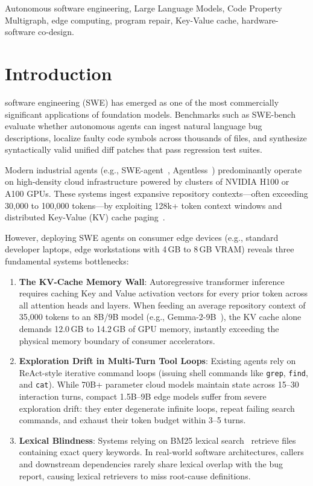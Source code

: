 \documentclass[journal]{IEEEtran}
\begin{document}
\begin{IEEEkeywords}
Autonomous software engineering, Large Language Models, Code Property Multigraph, edge computing, program repair, Key-Value cache, hardware-software co-design.
\end{IEEEkeywords}


\section{Introduction}
\label{sec:intro}

 software engineering (SWE) has emerged as one of the most commercially significant applications of foundation models. Benchmarks such as SWE-bench~\cite{jimenez2024swebench} evaluate whether autonomous agents can ingest natural language bug descriptions, localize faulty code symbols across thousands of files, and synthesize syntactically valid unified diff patches that pass regression test suites.

Modern industrial agents (e.g., SWE-agent~\cite{yang2024sweagent}, Agentless~\cite{xia2024agentless}) predominantly operate on high-density cloud infrastructure powered by clusters of NVIDIA H100 or A100 GPUs. These systems ingest expansive repository contexts---often exceeding 30,000 to 100,000 tokens---by exploiting 128k+ token context windows and distributed Key-Value (KV) cache paging~\cite{kwon2023vllm}.

However, deploying SWE agents on consumer edge devices (e.g., standard developer laptops, edge workstations with 4\,GB to 8\,GB VRAM) reveals three fundamental systems bottlenecks:
\begin{enumerate}
    \item \textbf{The KV-Cache Memory Wall}: Autoregressive transformer inference requires caching Key and Value activation vectors for every prior token across all attention heads and layers. When feeding an average repository context of 35,000 tokens to an 8B/9B model (e.g., Gemma-2-9B~\cite{gemmateam2024gemma2}), the KV cache alone demands 12.0\,GB to 14.2\,GB of GPU memory, instantly exceeding the physical memory boundary of consumer accelerators.
    \item \textbf{Exploration Drift in Multi-Turn Tool Loops}: Existing agents rely on ReAct-style iterative command loops (issuing shell commands like \texttt{grep}, \texttt{find}, and \texttt{cat}). While 70B+ parameter cloud models maintain state across 15--30 interaction turns, compact 1.5B--9B edge models suffer from severe exploration drift: they enter degenerate infinite loops, repeat failing search commands, and exhaust their token budget within 3--5 turns.
    \item \textbf{Lexical Blindness}: Systems relying on BM25 lexical search~\cite{xia2024agentless} retrieve files containing exact query keywords. In real-world software architectures, callers and downstream dependencies rarely share lexical overlap with the bug report, causing lexical retrievers to miss root-cause definitions.
\end{enumerate}
\end{document}
